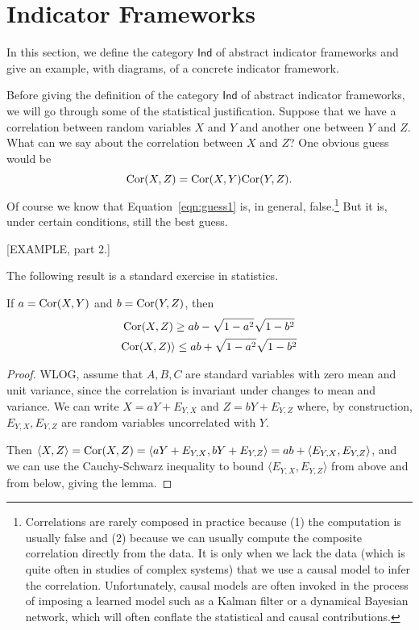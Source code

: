 \documentclass[sigconf]{acmart}
\newcommand{\redout}[1]{{\color{red}#1}}
\newcommand{\Cat}[1]{\mathsf{#1}}
\def\Ind{\Cat{Ind}}
\def\Cor{\textnormal{Cor}}
\begin{document}
\section{Indicator Frameworks}
In this section, we define the category $\Ind$ of abstract indicator frameworks and give an example, with diagrams, of a concrete indicator framework.

Before giving the definition of the category $\Ind$ of abstract indicator frameworks, we will go through some of the statistical justification. Suppose that we have a correlation between random variables $X$ and $Y$ and another one between $Y$ and $Z$. What can we say about the correlation between $X$ and $Z$? One obvious guess would be 
\begin{equation}\label{eqn:guess1}\Cor(X,Z) = \Cor(X,Y)\Cor(Y,Z).\end{equation}
Of course we know that Equation~\ref{eqn:guess1} is, in general, false.\footnote{Correlations are rarely composed in practice because (1) the computation is usually false and (2) because we can usually compute the composite correlation directly from the data. It is only when we lack the data (which is quite often in studies of complex systems) that we use a causal model to infer the correlation. Unfortunately, causal models are often invoked in the process of imposing a learned model such as a Kalman filter or a dynamical Bayesian network, which will often conflate the statistical and causal contributions.} But it is, under certain conditions, still the best guess. 

\redout{[EXAMPLE, part 2.]}

The following result is a standard exercise in statistics.%

\begin{lemma}If $a = \Cor(X,Y)$ and $b = \Cor(Y,Z)$, then 
\begin{gather}
\Cor(X,Z) \geq ab - \sqrt{1-a^2}\sqrt{1-b^2} \\ 
\Cor(X,Z) \rangle \leq ab + \sqrt{1-a^2}\sqrt{1-b^2}
\end{gather}
\end{lemma}

\begin{proof}
WLOG, assume that $A,B,C$ are standard variables with zero mean and unit variance, since the correlation is invariant under changes to mean and variance. We can write $X = a Y + E_{Y,X}$ and $Z = b Y + E_{Y,Z}$ where, by construction, $E_{Y,X}, E_{Y,Z}$ are random variables uncorrelated with $Y$.

Then $\langle X, Z \rangle = \Cor(X,Z) = \langle aY + E_{Y,X}, bY + E_{Y,Z} \rangle = ab + \langle E_{Y,X}, E_{Y,Z} \rangle$, and we can use the Cauchy-Schwarz inequality to bound $\langle E_{Y,X}, E_{Y,Z} \rangle$ from above and from below, giving the lemma.
\end{proof}
\end{document}
